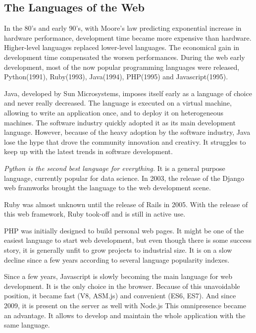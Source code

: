 \subsection{The Languages of the Web}

In the 80's and early 90's, with Moore's law predicting exponential increase in hardware performance, development time became more expensive than hardware.
Higher-level languages replaced lower-level languages. %
The economical gain in development time compensated the worsen performances.
During the web early development, most of the now popular programming languages were released, Python(1991), Ruby(1993), Java(1994), PHP(1995) and Javascript(1995).

Java, developed by Sun Microsystems, imposes itself early as a language of choice and never really decreased.
The language is executed on a virtual machine, allowing to write an application once, and to deploy it on heterogeneous machines.
The software industry quickly adopted it as its main development language.
However, because of the heavy adoption by the software industry, Java lose the hype that drove the community innovation and creativy.
It struggles to keep up with the latest trends in software development.

\textit{Python is the second best language for everything.}
It is a general purpose language, currently popular for data science.
In 2003, the release of the Django web framworks brought the language to the web development scene.

Ruby was almost unknown until the release of Rails in 2005.
With the release of this web framework, Ruby took-off and is still in active use.

PHP %
was initially designed to build personal web pages.
It might be one of the easiest language to start web development, but even though there is some success story, it is generally unfit to grow projects to industrial size.
It is on a slow decline since a few years according to several language popularity indexes.

Since a few years, Javascript is slowly becoming the main language for web development.
It is the only choice in the browser.
Because of this unavoidable position, it became fast (V8, ASM.js) and convenient (ES6, ES7).
And since 2009, it is present on the server as well with Node.js
This omnipresence became an advantage.
It allows to develop and maintain the whole application with the same language.


